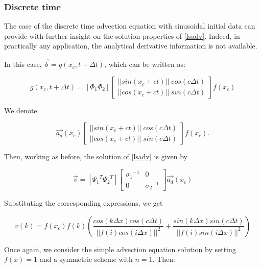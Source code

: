 \documentclass[%
  twocolumn
]{mpi2015-cscpreprint}
\begin{document}
\subsubsection{Discrete time}
\label{disc_time}

The case of the discrete time advection equation with sinusoidal initial data can provide with further insight on the solution properties of \ref{lsadv}. Indeed, in practically any application, the analytical derivative information is not available.

In this case,  $\Vec{b}=g(x_c,t+\Delta t)$, which can be written as:

\begin{equation}
g(x_c,t+\Delta t)=[\Phi_1 \Phi_2]     
\begin{bmatrix}
|| sin(x_c+ct) || \; cos(c \Delta t) \\
|| cos(x_c+ct) || \; sin(c \Delta t)
\end{bmatrix}
f(x_c)
\end{equation}

We denote 

\begin{equation}
\Vec{a_d}(x_c)  
\begin{bmatrix}
|| sin(x_c+ct) || \; cos(c \Delta t) \\
|| cos(x_c+ct) || \; sin(c \Delta t)
\end{bmatrix}
f(x_c).
\end{equation}

Then, working as before, the solution of \ref{lsadv} is given by

\begin{equation}
    \Vec{v}=[{\Psi_1}^T {\Psi_2}^T]
    \begin{bmatrix}
{\sigma_1}^{-1} & 0 \\
0 & {\sigma_2}^{-1}
\end{bmatrix}
\Vec{a_d}(x_c)  
\end{equation}

Substituting the corresponding expressions, we get

\begin{equation}
    v(k)=f(x_c)f(k)\left( \frac{cos(k \Delta x) cos(c \Delta t)}{{|| f(i) cos(i \Delta x) ||}^2 }+\frac{sin(k \Delta x) sin(c \Delta t)}{{|| f(i) sin(i \Delta x) ||}^2 } \right)
\end{equation}


Once again, we consider the simple advection equation solution by setting $f(x)=1$ and a symmetric scheme with $n=1$. Then:
\end{document}
